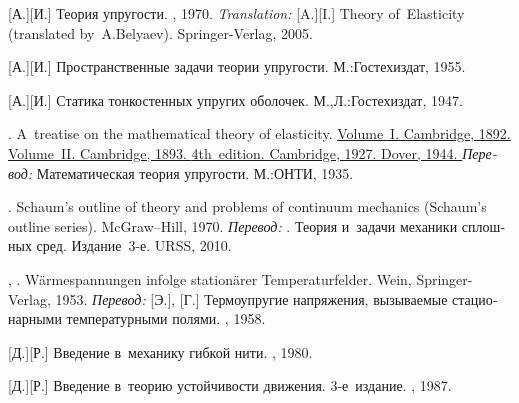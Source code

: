 \begin{thebibliography}{123}
\begin{otherlanguage}{russian}
[А.][И.] Теория упругости. \naukapublisher, 1970. 
\emph{Translation:}
[A.][I.] Theory of~Elasticity (translated by~A.\:Belyaev). Springer-Verlag, 2005. 

[А.][И.] Пространственные задачи теории упругости. М.:\;Гос\-тех\-издат, 1955. 

[А.][И.] Статика тонкостенных упругих оболочек. М.,\:Л.:\;Гос\-тех\-издат, 1947. 

.
A~treatise on the mathematical theory of elasticity.
\href{https://hal.archives-ouvertes.fr/hal-01307751/document}{
Volume~I.
Cambridge, 1892.
}
\href{https://archive.org/details/in.ernet.dli.2015.503659}{
Volume~II.
Cambridge, 1893.
}
\href{https://archive.org/details/in.ernet.dli.2015.462644/page/n1}{
4th~edition.
Cambridge, 1927.
Dover, 1944.
}
\emph{Перевод:}
Математическая теория упругости.
М.:\;ОНТИ,
1935.

.
Schaum’s outline of theory and problems of continuum mechanics
(Schaum’s outline series).
McGraw\hbox{--}Hill,
1970.
\emph{Перевод:}
.
Теория и~задачи механики сплошных сред.
Издание~3\hbox{-}е.
URSS, 2010.

, . Wärmespannungen infolge stationärer Temperaturfelder. Wein, Springer-Verlag, 1953. 
\emph{Перевод:} [Э.], [Г.] Термоупругие напряжения, вызываемые стационарными температурными полями. \fizmatgiz, 1958. 

[Д.][Р.] Введение в~механику гибкой нити. \naukapublisher, 1980. 

[Д.][Р.] Введение в~теорию устойчивости движения. 3\hbox{-}е~издание. \naukapublisher, 1987. 


\end{otherlanguage}
\end{thebibliography}
